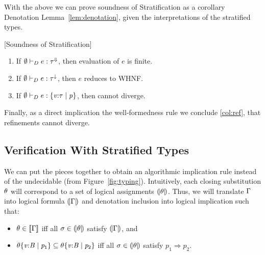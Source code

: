 With the above we can prove soundness of Stratification as a corollary 
Denotation Lemma~\ref{lem:denotation}, given the interpretations of 
the stratified types. 
%
\begin{corollary}{[Soundness of Stratification]}\label{cor:stratification} 
\begin{enumerate}
  \item If $\emptyset \vdash_D e:{\mathit{\tau}}^{\Downarrow}$, then  evaluation of $e$ is finite.
  \item If $\emptyset \vdash_D e:{\mathit{\tau}}^{\downarrow}$, then  $e$ reduces to WHNF.
  \item\label{col:ref} If $\emptyset \vdash_D e:\mathtt{\{{\mathit{v}} \text{:} {\ensuremath{\mathit{\tau}}}\mid {\ensuremath{\mathit{p}}}\}}$, then \p cannot diverge.
\end{enumerate}
\end{corollary}

Finally, as a direct implication the well-formedness rule \rwbased 
we conclude \ref{col:ref}, \ie that refinements cannot diverge.

\subsection{Verification With Stratified Types}\label{sec:typing:vc}

We can put the pieces together to obtain an algorithmic implication 
rule \rtdimp instead of the undecidable \rimpl (from Figure~\ref{fig:typing}).
%
Intuitively, each closing substitution $\theta$ will correspond to 
a set of logical assignments $(\!|\theta|\!)$. 
%
Thus, we will translate $\Gamma$ into logical
formula $(\!|\Gamma|\!)$ and 
denotation inclusion into logical implication 
such that:
%
\begin{itemize}
\item $\theta \in [\![\Gamma]\!]$ iff all $\sigma \in (\!|\theta|\!)$ 
     satisfy $(\!|\Gamma|\!)$, and 
\item ${\sto}{\ttreft{\vv}{\mathit{B}}{\p_1}}\subseteq {\sto}{\ttreft{\vv}{\mathit{B}}{\p_2}}$ 
		iff all $\sigma \in (\!|\theta|\!)$ satisfy $p_1 \Rightarrow p_2$.
\end{itemize} %


